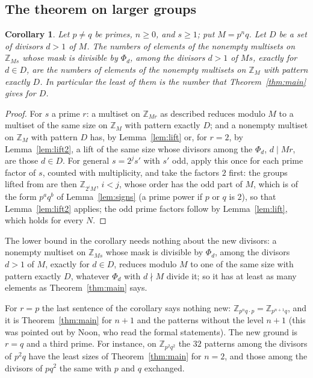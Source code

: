 \documentclass[11pt,a4paper]{amsart}
\newtheorem{corollary}[theorem]{Corollary}
\theoremstyle{definition}
\theoremstyle{remark}
\newcommand{\Z}{\mathbb{Z}}
\begin{document}
\subsection*{The theorem on larger groups}

\begin{corollary}\label{cor:lift}
Let $p\ne q$ be primes, $n\ge0$, and $s\ge1$; put $M=p^nq$. Let $D$ be a set of divisors $d>1$ of $M$. The numbers of
elements of the nonempty multisets on $\Z_{Ms}$ whose mask is divisible by $\Phi_d$, among the divisors $d>1$ of
$Ms$, exactly for $d\in D$, are the numbers of elements of the nonempty multisets on $\Z_M$ with pattern exactly
$D$. In particular the least of them is the number that Theorem~\ref{thm:main} gives for $D$.
\end{corollary}
\begin{proof}
For $s$ a prime $r$: a multiset on $\Z_{Mr}$ as described reduces modulo $M$ to a multiset of the same
size on $\Z_M$ with pattern exactly $D$; and a nonempty multiset on $\Z_M$ with pattern $D$ has, by
Lemma~\ref{lem:lift} or, for $r=2$, by Lemma~\ref{lem:lift2}, a lift of the same size whose divisors among the $\Phi_d$, $d\mid Mr$, are
those $d\in D$. For general $s=2^js'$ with $s'$ odd, apply this once for each prime factor of $s$, counted with
multiplicity, and take the factors $2$ first: the groups lifted from are then $\Z_{2^iM}$, $i<j$, whose order has the
odd part of $M$, which is of the form $p^aq^b$ of Lemma~\ref{lem:signs} (a prime power if $p$ or $q$ is $2$), so that
Lemma~\ref{lem:lift2} applies; the odd prime factors follow by Lemma~\ref{lem:lift}, which holds for every $N$.
\end{proof}

The lower bound in the corollary needs nothing about the new divisors: a nonempty multiset on $\Z_{Ms}$ whose mask is
divisible by $\Phi_d$, among the divisors $d>1$ of $M$, exactly for $d\in D$, reduces modulo $M$ to one of the same
size with pattern exactly $D$, whatever $\Phi_d$ with $d\nmid M$ divide it; so it has at least as many elements as
Theorem~\ref{thm:main} says.

For $r=p$ the last sentence of the corollary says nothing new: $\Z_{p^nq\cdot p}=\Z_{p^{n+1}q}$, and it is Theorem~\ref{thm:main} for $n+1$ and the patterns
without the level $n+1$ (this was pointed out by Noon, who read the formal statements). The new ground is $r=q$ and a third prime.
For instance, on $\Z_{p^2q^2}$ the $32$ patterns among the divisors of $p^2q$ have the least sizes of
Theorem~\ref{thm:main} for $n=2$, and those among the divisors of $pq^2$ the same with $p$ and $q$ exchanged.
\end{document}
